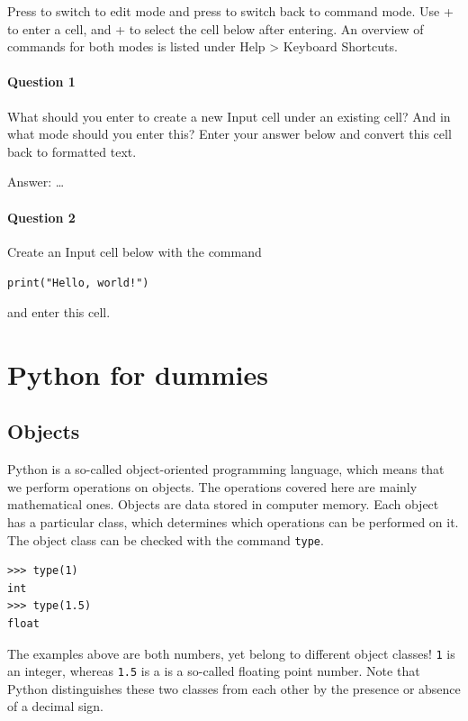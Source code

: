 Press  to switch to edit mode and press  to switch back to command mode. Use  +  to enter a cell, and  +  to select the cell below after entering. An overview of commands for both modes is listed under Help > Keyboard Shortcuts.

\paragraph{Question 1} 
What should you enter to create a new Input cell under an existing cell? And in what mode should you enter this? Enter your answer below and convert this cell back to formatted text.
\begin{JupyterMarkdown}
	Answer: \ldots
\end{JupyterMarkdown}

\paragraph{Question 2}
Create an Input cell below with the command
\begin{center}
	\lstinline|print("Hello, world!")|
\end{center}
and enter this cell.

\section{Python for dummies}
\subsection{Objects}
Python is a so-called object-oriented programming language, which means that we perform operations on objects. The operations covered here are mainly mathematical ones. Objects are data stored in computer memory. Each object has a particular class, which determines which operations can be performed on it. The object class can be checked with the command \lstinline|type|.

\begin{lstlisting}[]
>>> type(1)
int
>>> type(1.5)
float
\end{lstlisting}

The examples above are both numbers, yet belong to different object classes! \lstinline|1| is an integer, whereas \lstinline|1.5| is a is a so-called floating point number. Note that Python distinguishes these two classes from each other by the presence or absence of a decimal sign.

